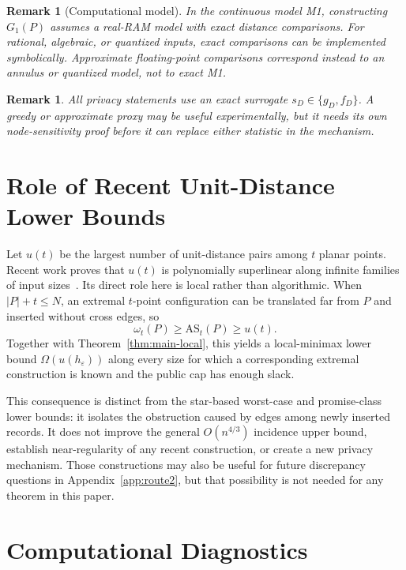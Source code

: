 \documentclass[11pt]{article}
\newtheorem{remark}[theorem]{Remark}
\newcommand{\eps}{\varepsilon}
\begin{document}
\begin{remark}[Computational model]
In the continuous model M1, constructing \(G_1(P)\) assumes a real-RAM model with exact distance comparisons. For rational, algebraic, or quantized inputs, exact comparisons can be implemented symbolically. Approximate floating-point comparisons correspond instead to an annulus or quantized model, not to exact M1.
\end{remark}

\begin{remark}
All privacy statements use an exact surrogate \(s_D\in\{g_D,f_D\}\). A greedy or approximate proxy may be useful experimentally, but it needs its own node-sensitivity proof before it can replace either statistic in the mechanism.
\end{remark}


\section{Role of Recent Unit-Distance Lower Bounds}
\label{sec:breakthrough}

Let \(u(t)\) be the largest number of unit-distance pairs among \(t\) planar points. Recent work proves that \(u(t)\) is polynomially superlinear along infinite families of input sizes~\cite{OpenAI2026,Remarks2026,Sawin2026,Emmerich2026}. Its direct role here is local rather than algorithmic. When \(|P|+t\le N\), an extremal \(t\)-point configuration can be translated far from \(P\) and inserted without cross edges, so
\[
\omega_t(P)\ge \mathrm{AS}_t(P)\ge u(t).
\]
Together with Theorem~\ref{thm:main-local}, this yields a local-minimax lower bound \(\Omega(u(h_\eps))\) along every size for which a corresponding extremal construction is known and the public cap has enough slack.

This consequence is distinct from the star-based worst-case and promise-class lower bounds: it isolates the obstruction caused by edges among newly inserted records. It does not improve the general \(O(n^{4/3})\) incidence upper bound, establish near-regularity of any recent construction, or create a new privacy mechanism. Those constructions may also be useful for future discrepancy questions in Appendix~\ref{app:route2}, but that possibility is not needed for any theorem in this paper.

\section{Computational Diagnostics}
\end{document}
